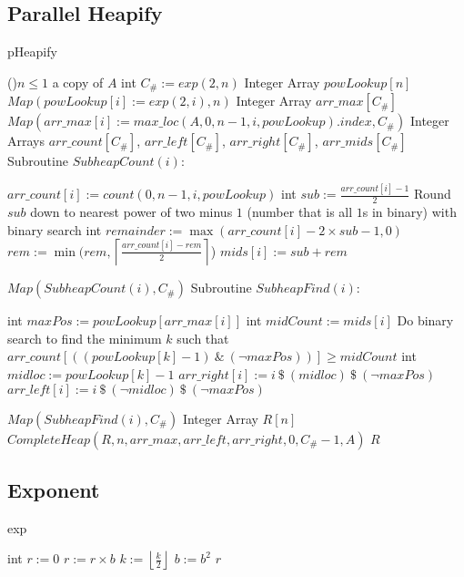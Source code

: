 \documentclass[letterpaper, reqno, 11pt]{article}
\begin{document}
\subsection*{Parallel Heapify}
\begin{algorithm}[H]
\caption{pHeapify}
\If(){$n\leq1$}
{
	\Return a copy of $A$\;
}
int $C_\#:=exp(2, n)$
Integer Array $powLookup[n]$\;
$Map(powLookup[i]:=exp(2,i),n)$
Integer Array $arr\_max[C_\#]$
$Map(arr\_max[i]:=max\_loc(A,0,n-1,i,powLookup).index, C_\#)$\;
Integer Arrays $arr\_count[C_\#]$, $arr\_left[C_\#]$, $arr\_right[C_\#]$, $arr\_mids[C_\#]$\;
Subroutine $SubheapCount(i)$:
\begin{description}
	\item{}
	$arr\_count[i]:=count(0,n-1,i,powLookup)$\;
	int $sub:=\frac{arr\_count[i]-1}{2}$\;
	Round $sub$ down to nearest power of two minus $1$
	(number that is all $1$s in binary) with binary search\;
	int $remainder:=\max(arr\_count[i]-2\times sub-1,0)$
	$rem:=\min(rem,\left\lceil\frac{arr\_count[i]-rem}{2}\right\rceil$)
	$mids[i]:=sub+rem$
\end{description}
$Map(SubheapCount(i), C_\#)$\;
Subroutine $SubheapFind(i)$:
\begin{description}
	\item{}
	int $maxPos:=powLookup[arr\_max[i]]$
	int $midCount:=mids[i]$
	Do binary search to find the minimum $k$ such that
	$arr\_count[((powLookup[k]-1)\ \&\ (\neg maxPos))]\geq midCount$
	int $midloc:=powLookup[k]-1$
	$arr\_right[i]:=i\ \$\ (midloc)\ \$\ (\neg maxPos)$\;
	$arr\_left[i]:=i\ \$\ (\neg midloc)\ \$\ (\neg maxPos)$\;
\end{description}
$Map(SubheapFind(i), C_\#)$\;
Integer Array $R[n]$\;
$CompleteHeap(R, n, arr\_max, arr\_left, arr\_right, 0, C_\#-1, A)$\;
\Return $R$\;
\end{algorithm}

\subsection*{Exponent}
\begin{algorithm}[H]
\caption{exp}
int $r:=0$
{
	{
		$r:=r\times b$\;
	}
	$k:=\left\lfloor\frac{k}{2}\right\rfloor$\;
	$b:=b^2$\;
}
\Return $r$\;
\end{algorithm}
\end{document}
